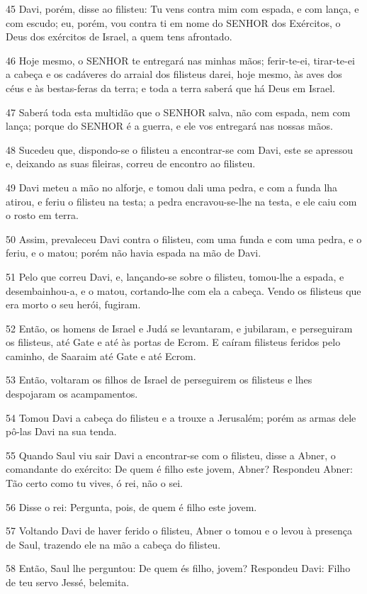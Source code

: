 \par 45 Davi, porém, disse ao filisteu: Tu vens contra mim com espada, e com lança, e com escudo; eu, porém, vou contra ti em nome do SENHOR dos Exércitos, o Deus dos exércitos de Israel, a quem tens afrontado.
\par 46 Hoje mesmo, o SENHOR te entregará nas minhas mãos; ferir-te-ei, tirar-te-ei a cabeça e os cadáveres do arraial dos filisteus darei, hoje mesmo, às aves dos céus e às bestas-feras da terra; e toda a terra saberá que há Deus em Israel.
\par 47 Saberá toda esta multidão que o SENHOR salva, não com espada, nem com lança; porque do SENHOR é a guerra, e ele vos entregará nas nossas mãos.
\par 48 Sucedeu que, dispondo-se o filisteu a encontrar-se com Davi, este se apressou e, deixando as suas fileiras, correu de encontro ao filisteu.
\par 49 Davi meteu a mão no alforje, e tomou dali uma pedra, e com a funda lha atirou, e feriu o filisteu na testa; a pedra encravou-se-lhe na testa, e ele caiu com o rosto em terra.
\par 50 Assim, prevaleceu Davi contra o filisteu, com uma funda e com uma pedra, e o feriu, e o matou; porém não havia espada na mão de Davi.
\par 51 Pelo que correu Davi, e, lançando-se sobre o filisteu, tomou-lhe a espada, e desembainhou-a, e o matou, cortando-lhe com ela a cabeça. Vendo os filisteus que era morto o seu herói, fugiram.
\par 52 Então, os homens de Israel e Judá se levantaram, e jubilaram, e perseguiram os filisteus, até Gate e até às portas de Ecrom. E caíram filisteus feridos pelo caminho, de Saaraim até Gate e até Ecrom.
\par 53 Então, voltaram os filhos de Israel de perseguirem os filisteus e lhes despojaram os acampamentos.
\par 54 Tomou Davi a cabeça do filisteu e a trouxe a Jerusalém; porém as armas dele pô-las Davi na sua tenda.
\par 55 Quando Saul viu sair Davi a encontrar-se com o filisteu, disse a Abner, o comandante do exército: De quem é filho este jovem, Abner? Respondeu Abner: Tão certo como tu vives, ó rei, não o sei.
\par 56 Disse o rei: Pergunta, pois, de quem é filho este jovem.
\par 57 Voltando Davi de haver ferido o filisteu, Abner o tomou e o levou à presença de Saul, trazendo ele na mão a cabeça do filisteu.
\par 58 Então, Saul lhe perguntou: De quem és filho, jovem? Respondeu Davi: Filho de teu servo Jessé, belemita.

